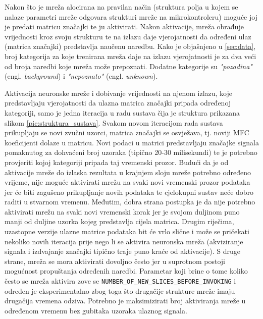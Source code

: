 Nakon što je mreža alocirana na pravilan način (struktura polja u kojem se nalaze parametri
mreže odgovara strukturi mreže na mikrokontroleru) moguće joj je predati matricu značajki
te ju aktivirati. Nakon aktivacije, mreža obrađuje vrijednosti kroz svoju strukturu te na
izlazu daje vjerojatnosti da određeni ulaz (matrica značajki) predstavlja naučenu naredbu.
Kako je objašnjeno u \ref{sec:data}, broj kategorija za koje trenirana mreža daje na izlazu
vjerojatnosti je za dva veći od broja naredbi koje mreža može prepoznati. Dodatne kategorije
su \textit{"pozadina"} (engl. \textit{background}) i \textit{"nepoznato"} (engl. \textit{unknown}). 

Aktivacija neuronske mreže i dobivanje vrijednosti na njenom izlazu, koje predstavljaju
vjerojatnosti da ulazna matrica značajki pripada određenoj kategoriji, samo je jedna iteracija 
u radu sustava čija je struktura prikazana slikom \ref{pic:struktura_sustava}. Svakom novom 
iteracijom rada sustava prikupljaju se novi zvučni uzorci, matrica značajki se osvježava, 
tj. noviji MFC koeficijenti dolaze u matricu. Novi podaci u matrici predstavljaju značajke 
signala pomaknutog za dohvaćeni broj uzoraka (tipično 20-30 milisekundi) te je potrebno provjeriti
kojoj kategoriji pripada taj vremenski prozor. Budući da je od aktivacije mreže do izlaska 
rezultata u krajnjem sloju mreže potrebno određeno vrijeme, nije moguće aktivirati mrežu 
na svaki novi vremenski prozor podataka jer će biti zagušeno prikupljanje novih podataka
te cjelokupni sustav neće dobro raditi u stvarnom vremenu. Međutim, dobra strana postupka je da
nije potrebno aktivirati mrežu na svaki novi vremenski korak jer je svojom duljinom
puno manji od duljine uzorka kojeg predstavlja cijela matrica. Drugim riječima, uzastopne
verzije ulazne matrice podataka bit će vrlo slične i može se pričekati nekoliko novih
iteracija prije nego li se aktivira neuronska mreža (akviziranje signala i izdvajanje značajki
tipično traje puno kraće od aktivacije). S druge strane, mreža se mora aktivirati dovoljno
često jer u suprotnom postoji mogućnost propuštanja određenih naredbi. Parametar koji brine o tome 
koliko često se mreža aktivira zove se \texttt{NUMBER\_OF\_NEW\_SLICES\_BEFORE\_INVOKING} i određen
je eksperimentalno zbog toga što drugačije strukture mreže imaju drugačija vremena odziva.
Potrebno je maksimizirati broj aktiviranja mreže u određenom vremenu bez gubitaka
uzoraka ulaznog signala.

